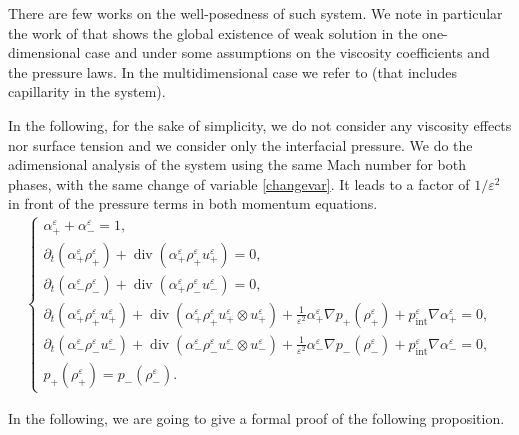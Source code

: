 \documentclass[11pt, twoside, a4paper]{article}
\theoremstyle{plain}
\theoremstyle{remark}
\numberwithin{equation}{section}
\renewcommand{\div}{\operatorname{div}}
\newcommand{\dt}{\partial_t}
\newcommand{\eps}{\varepsilon}
\newcommand{\ap}{\alpha_+}
\newcommand{\am}{\alpha_-}
\newcommand{\rp}{\rho_+}
\newcommand{\rmi}{\rho_-}
\begin{document}
There are few works on the well-posedness of such system. We note in particular the work of \cite{bresch2012global} that shows the global existence of weak solution in the one-dimensional case and under some assumptions on the viscosity coefficients and the pressure laws. In the multidimensional case we refer to \cite{bresch2010global} (that includes capillarity in the system). 

In the following, for the sake of simplicity, we do not consider any viscosity effects nor surface tension and we consider only the interfacial pressure. We do the adimensional analysis of the system using the same Mach number for both phases, with the same change of variable \eqref{changevar}. It leads to a factor of $1/\eps^2$ in front of the pressure terms in both momentum equations.
\begin{align}
    \left\{
        \begin{array}{l}\label{algebraic2velocityeps}
            \ap^\eps + \am^\eps = 1,\\
            \dt (\ap^\eps \rp^\eps) + \div(\ap^\eps \rp^\eps u_+^\eps) = 0,\\
            \dt (\am^\eps \rmi^\eps) + \div(\ap^\eps \rmi^\eps u_-^\eps) = 0,\\
            \dt (\ap^\eps \rp^\eps u_+^\eps) + \div (\ap^\eps \rp^\eps u_+^\eps \otimes u_+^\eps) + \frac{1}{\eps^2} \ap^\eps \nabla p_+(\rp^\eps) +p_{\mathrm{int}}^\eps \nabla \ap^\eps=0,\\
            \dt (\am^\eps \rmi^\eps u_-^\eps) + \div (\am^\eps \rmi^\eps u_-^\eps \otimes u_-^\eps) + \frac{1}{\eps^2} \am^\eps \nabla p_-(\rmi^\eps) + p_{\mathrm{int}}^\eps \nabla \am^\eps=0,\\
            p_+(\rp^\eps) = p_-(\rmi^\eps).
        \end{array}
    \right.
\end{align}

In the following, we are going to give a formal proof of the following proposition.
\end{document}

